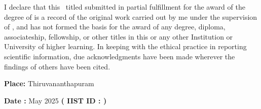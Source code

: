 I declare that this \Doctype \ titled \textbf{\textit{\Title}} submitted in
partial fulfillment for the award of the degree of
{\bf\Degreetext} is a record of the original work carried out by me
under the supervision of {\bf\Advisor}, and has not formed the basis for the
award of any degree, diploma, associateship, fellowship, or other titles in
this or any other Institution or University of higher learning. In keeping
with the ethical practice in reporting scientific information, due
acknowledgments have been made wherever the findings of others have been
cited.

\vspace{15mm}

\noindent\textbf{Place: }Thiruvananthapuram \hfill \textbf{\Author \hspace{5mm}}

\noindent\textbf{Date : }{May 2025 \hfill \textbf{( IIST ID : \Studentid)\hspace{3mm}}}

